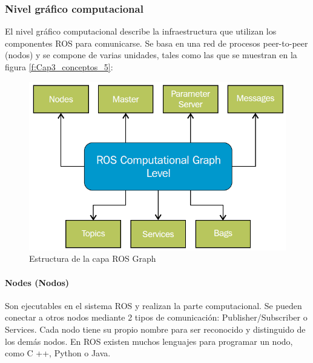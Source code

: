 \newpage
            \subsubsection{Nivel gráfico computacional}
            
            El nivel gráfico computacional describe la infraestructura que utilizan los componentes ROS para comunicarse. Se basa en una red de procesos peer-to-peer (nodos) y se compone de varias unidades, tales como las que se muestran en la figura \eqref{f:Cap3_conceptos_5}:
            
            \begin{figure}[htb]
                \centering
                \includegraphics[width=0.63\linewidth]{Main/Chapter3/Images3/n_s_a_5.png}
                \caption{Estructura de la capa ROS Graph \cite{lentin_2015}}
                \label{f:Cap3_conceptos_5}
            \end{figure} 
            
            \paragraph{Nodes (Nodos)}
                   Son ejecutables en el sistema ROS y realizan la parte computacional. Se pueden conectar a otros nodos mediante 2 tipos de comunicación: Publisher/Subscriber o Services. Cada nodo tiene su propio nombre para ser reconocido y distinguido de los demás nodos. En ROS existen muchos lenguajes para programar un nodo, como C ++, Python o Java. 
                   
